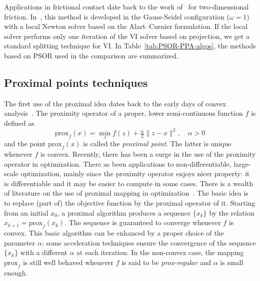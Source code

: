 Applications in frictional contact date back to the work of~\cite{Mitsopoulou.Doudoumis1988,Mitsopoulou.Doudoumis1987} for two-dimensional friction. In~\cite{Jourdan.Alart.ea98}, this method is developed in the Gauss-Seidel configuration ($\omega=1$) with a local Newton solver based on the Alart--Curnier formulation. If the local solver performs only one iteration of the VI solver based on projection, we get a standard splitting technique for VI. In Table~\ref{tab:PSOR-PPA-algos}, the methods based on PSOR used in the comparison are summarized.

\subsection{Proximal points techniques}\label{Sec:Prox}

The first use of the proximal idea dates back to the early days of convex analysis~\citep{Moreau1965}.
The proximity operator of a proper, lower semi-continuous function $f$ is defined as
\begin{equation}
 \mathrm{prox}_f(x) = \min_z f(z) + \tfrac{\alpha}{2}\|z-x\|^2,\quad \alpha>0
\end{equation}
and the point $\mathrm{prox}_f(x)$ is called the \emph{proximal point}.
The latter is unique whenever $f$ is convex.
Recently, there has been a surge in the use of the proximity operator in optimization.
There as been applications to non-differentiable, large-scale optimization,
mainly since the proximity operator enjoys nicer property: it is differentiable
and it may be easier to compute in some cases.
There is a wealth of literature on the use of proximal mapping in optimization~\citep{parikh2014proximal}.
The basic idea is to replace (part of) the objective function by the proximal operator of it.
Starting from an initial $x_0$, a proximal algorithm produces a sequence $\{x_k\}$ by the relation
$x_{k+1} = \mathrm{prox}_f(x_k)$. The sequence is guaranteed to converge whenever $f$ is convex.
This basic algorithm can be enhanced by a proper choice of the parameter $\alpha$:
some acceleration techniques ensure the convergence of the sequence $\{x_k\}$ with a different $\alpha$
at each iteration. In the non-convex case, the mapping $\mathrm{prox}_f$ is still well behaved
whenever $f$ is said to be \emph{prox-regular} and $\alpha$ is small enough.

